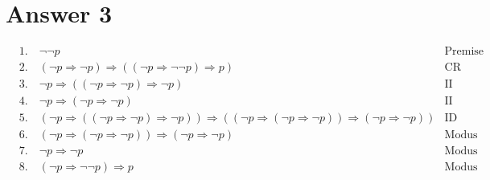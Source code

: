 \documentclass[12pt]{article}
\begin{document}
\section*{Answer 3}

\begin{align*}
    & 1. \hspace{1em} \neg\neg p                                                                                                                                                                            & \text{Premise} \\
    & 2. \hspace{1em} (\neg p \Rightarrow \neg p) \Rightarrow ((\neg p \Rightarrow \neg \neg p) \Rightarrow p)                                                                                              & \text{CR} \\
    & 3. \hspace{1em} \neg p \Rightarrow ((\neg p \Rightarrow \neg p) \Rightarrow \neg p)                                                                                                                   & \text{II} \\
    & 4. \hspace{1em} \neg p \Rightarrow (\neg p \Rightarrow \neg p)                                                                                                                                        & \text{II} \\
    & 5. \hspace{1em} (\neg p \Rightarrow ((\neg p \Rightarrow \neg p) \Rightarrow \neg p)) \Rightarrow ((\neg p \Rightarrow (\neg p \Rightarrow \neg p)) \Rightarrow (\neg p \Rightarrow \neg p))          & \text{ID} \\
    & 6. \hspace{1em} (\neg p \Rightarrow (\neg p \Rightarrow \neg p)) \Rightarrow (\neg p \Rightarrow \neg p)                                                                                              & \text{Modus Ponens: 5, 3} \\
    & 7. \hspace{1em} \neg p \Rightarrow \neg p                                                                                                                                                           & \text{Modus Ponens: 6, 4} \\
    & 8. \hspace{1em} (\neg p \Rightarrow \neg \neg p) \Rightarrow p                                                                                                                                      & \text{Modus Ponens: 7, 2} \\  

\end{align*}
\end{document}
